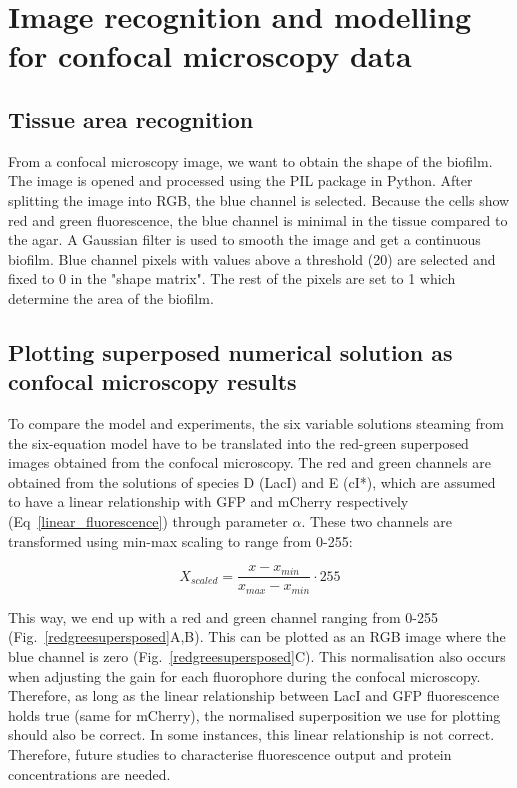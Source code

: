 \section{Image recognition and modelling for confocal microscopy data}
\subsection{Tissue area recognition}\label{Tissue area recognition}
From a confocal microscopy image, we want to obtain the shape of the biofilm.
The image is opened and processed using the PIL package in Python.
After splitting the image into RGB, the blue channel is selected.
Because the cells show red and green fluorescence, the blue channel is minimal in the tissue compared to the agar.
A Gaussian filter is used to smooth the image and get a continuous biofilm.
Blue channel pixels with values above a threshold (20) are selected and fixed to 0 in the "shape matrix".
The rest of the pixels are set to 1 which determine the area of the biofilm.

\subsection{Plotting superposed numerical solution as confocal microscopy results}\label{Plotting superposed numerical solution as confocal microscopy results}
To compare the model and experiments, the six variable solutions steaming from the six-equation model have to be translated into the red-green superposed images obtained from the confocal microscopy.
The red and green channels are obtained from the solutions of species D (LacI) and E (cI*), which are assumed to have a linear relationship with GFP and mCherry respectively (Eq~\ref{linear_fluorescence}) through parameter $\alpha$.
These two channels are transformed using min-max scaling to range from 0-255:

\begin{equation}
    X_{scaled} = \frac{x-x_{min}}{x_{max}-x_{min}} \cdot 255
\end{equation}

This way, we end up with a red and green channel ranging from 0-255 (Fig.~\ref{redgreesupersposed}A,B).
This can be plotted as an RGB image where the blue channel is zero (Fig.~\ref{redgreesupersposed}C).
This normalisation also occurs when adjusting the gain for each fluorophore during the confocal microscopy.
Therefore, as long as the linear relationship between LacI and GFP fluorescence holds true (same for mCherry), the normalised superposition we use for plotting should also be correct.
In some instances, this linear relationship is not correct.
Therefore, future studies to characterise fluorescence output and protein concentrations are needed.


